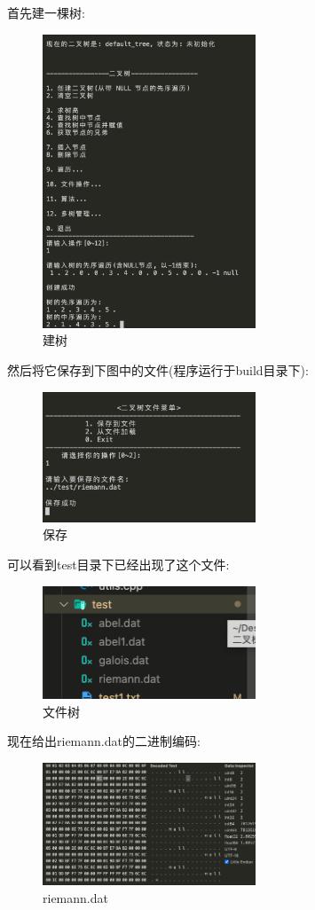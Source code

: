 \documentclass[supercite]{Experimental_Report}
\theoremstyle{definition}
\begin{document}
\clearpage
\noindent
首先建一棵树:
\begin{figure}[htbp]
	\centering
	\includegraphics[width=2.5in]{binary_tree/file/prelude.png}
	\caption{建树}
	\label{fig5-60}
\end{figure}

\noindent
然后将它保存到下图中的文件(程序运行于build目录下):
\begin{figure}[htbp]
	\centering
	\includegraphics[width=2.5in]{binary_tree/file/save1_1.png}
	\caption{保存}
	\label{fig5-61}
\end{figure}

\noindent
可以看到test目录下已经出现了这个文件:
\begin{figure}[H]
	\centering
	\includegraphics[width=2.5in]{binary_tree/file/file_tree.png}
	\caption{文件树}
	\label{fig5-62}
\end{figure}

\clearpage
\noindent
现在给出riemann.dat的二进制编码:
\begin{figure}[htbp]
	\centering
	\includegraphics[width=2.5in]{binary_tree/file/riemann_dat.png}
	\caption{riemann.dat}
	\label{fig5-63}
\end{figure}
\end{document}
